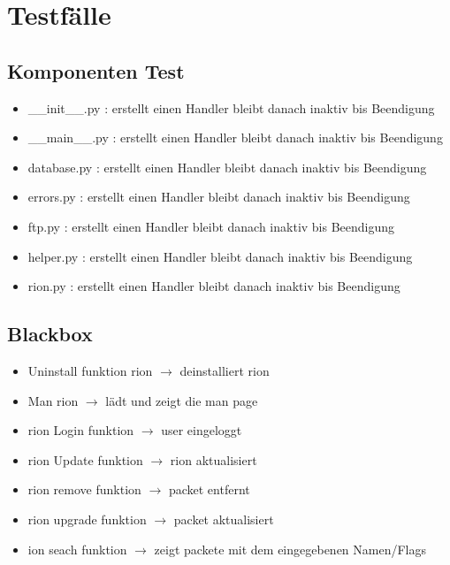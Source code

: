 \chapter{Testfälle}

\section{Komponenten Test}
\begin{itemize}
    \item \_\_init\_\_.py : erstellt einen Handler bleibt danach inaktiv bis Beendigung
    \item \_\_main\_\_.py : erstellt einen Handler bleibt danach inaktiv bis Beendigung
    \item database.py : erstellt einen Handler bleibt danach inaktiv bis Beendigung
    \item errors.py : erstellt einen Handler bleibt danach inaktiv bis Beendigung
    \item ftp.py : erstellt einen Handler bleibt danach inaktiv bis Beendigung
    \item helper.py : erstellt einen Handler bleibt danach inaktiv bis Beendigung
    \item rion.py : erstellt einen Handler bleibt danach inaktiv bis Beendigung
\end{itemize}


\section{Blackbox}
\begin{itemize}
    \item Uninstall funktion rion $\rightarrow$ deinstalliert rion 
    \item Man rion $\rightarrow$ lädt und zeigt die man page
    \item rion Login funktion $\rightarrow$ user eingeloggt
    \item rion Update funktion $\rightarrow$ rion aktualisiert
    \item rion remove funktion $\rightarrow$ packet entfernt
    \item rion upgrade funktion $\rightarrow$ packet aktualisiert
    \item ion seach funktion $\rightarrow$ zeigt packete mit dem eingegebenen Namen/Flags
\end{itemize}
